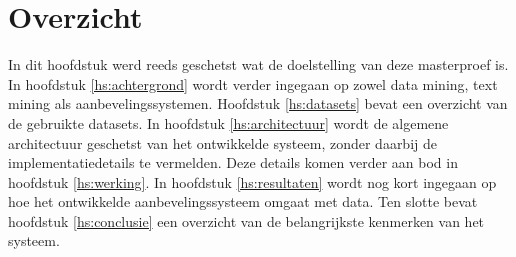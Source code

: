 \section{Overzicht}
In dit hoofdstuk werd reeds geschetst wat de doelstelling van deze masterproef is. In hoofdstuk \ref{hs:achtergrond} wordt verder ingegaan op zowel data mining, text mining als aanbevelingssystemen. Hoofdstuk \ref{hs:datasets} bevat een overzicht van de gebruikte datasets. In hoofdstuk \ref{hs:architectuur} wordt de algemene architectuur geschetst van het ontwikkelde systeem, zonder daarbij de implementatiedetails te vermelden. Deze details komen verder aan bod in hoofdstuk \ref{hs:werking}. In hoofdstuk \ref{hs:resultaten} wordt nog kort ingegaan op hoe het ontwikkelde aanbevelingssysteem omgaat met data. Ten slotte bevat hoofdstuk \ref{hs:conclusie} een overzicht van de belangrijkste kenmerken van het systeem.